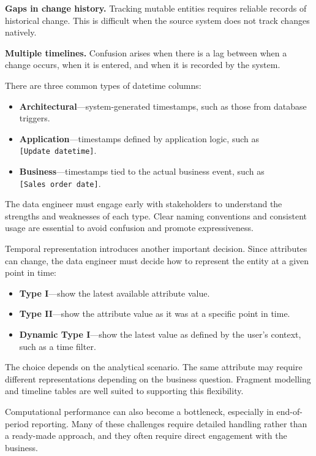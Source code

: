 \documentclass[10pt,openany,10pt]{book}
\providecommand{\tightlist}{%
  \setlength{\itemsep}{0pt}\setlength{\parskip}{0pt}}
\begin{document}
\textbf{Gaps in change history.} Tracking mutable entities requires
reliable records of historical change. This is difficult when the source
system does not track changes natively.

\textbf{Multiple timelines.} Confusion arises when there is a lag
between when a change occurs, when it is entered, and when it is
recorded by the system.

There are three common types of datetime columns:

\begin{itemize}
\tightlist
\item
  \textbf{Architectural}---system-generated timestamps, such as those
  from database triggers.
\item
  \textbf{Application}---timestamps defined by application logic, such
  as \texttt{{[}Update\ datetime{]}}.
\item
  \textbf{Business}---timestamps tied to the actual business event, such
  as \texttt{{[}Sales\ order\ date{]}}.
\end{itemize}

The data engineer must engage early with stakeholders to understand the
strengths and weaknesses of each type. Clear naming conventions and
consistent usage are essential to avoid confusion and promote
expressiveness.

Temporal representation introduces another important decision. Since
attributes can change, the data engineer must decide how to represent
the entity at a given point in time:

\begin{itemize}
\tightlist
\item
  \textbf{Type I}---show the latest available attribute value.
\item
  \textbf{Type II}---show the attribute value as it was at a specific
  point in time.
\item
  \textbf{Dynamic Type I}---show the latest value as defined by the
  user's context, such as a time filter.
\end{itemize}

The choice depends on the analytical scenario. The same attribute may
require different representations depending on the business question.
Fragment modelling and timeline tables are well suited to supporting
this flexibility.

Computational performance can also become a bottleneck, especially in
end-of-period reporting. Many of these challenges require detailed
handling rather than a ready-made approach, and they often require
direct engagement with the business.
\end{document}

